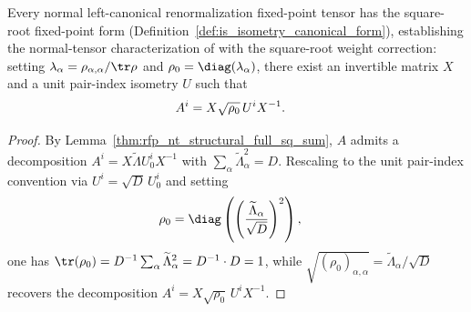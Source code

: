 \begin{lemma}%
    \label{thm:isometry_canonical_form_of_rfp_nt}
    \leanok
    Every normal left-canonical renormalization fixed-point tensor has the
    square-root fixed-point form (Definition~\ref{def:is_isometry_canonical_form}),
    establishing the normal-tensor characterization of
    \cite[Appendix~B, lines~1278--1300]{Cirac2016MPDO_arXiv} with the
    square-root weight correction: setting
    $\lambda_\alpha=\rho_{\alpha,\alpha}/\tr\rho$ and
    $\rho_0=\diag(\lambda_\alpha)$, there exist an invertible matrix $X$ and
    a unit pair-index isometry $U$ such that
    \begin{align}
        A^i & =X\sqrt{\rho_0}\,U^iX^{-1}.
        \notag
    \end{align}
\end{lemma}
\begin{proof}\leanok
    By Lemma~\ref{thm:rfp_nt_structural_full_sq_sum}, $A$ admits a
    decomposition $A^i = X\widetilde\Lambda U_0^i X^{-1}$ with
    $\sum_\alpha \widetilde\Lambda_\alpha^2 = D$. Rescaling to the unit
    pair-index convention via $U^i = \sqrt{D}\,U_0^i$ and setting
    \begin{align}
        \rho_0
         & =\diag\left(\left(\frac{\widetilde\Lambda_\alpha}{\sqrt D}\right)^2\right),
        \notag
    \end{align}
    one has
    $\tr(\rho_0)
        = D^{-1}\sum_\alpha \widetilde\Lambda_\alpha^2
        = D^{-1}\cdot D = 1$, while
    $\sqrt{(\rho_0)_{\alpha,\alpha}}
        =\widetilde\Lambda_\alpha/\sqrt D$ recovers the decomposition
    $A^i = X\sqrt{\rho_0}\,U^i X^{-1}$.
\end{proof}

